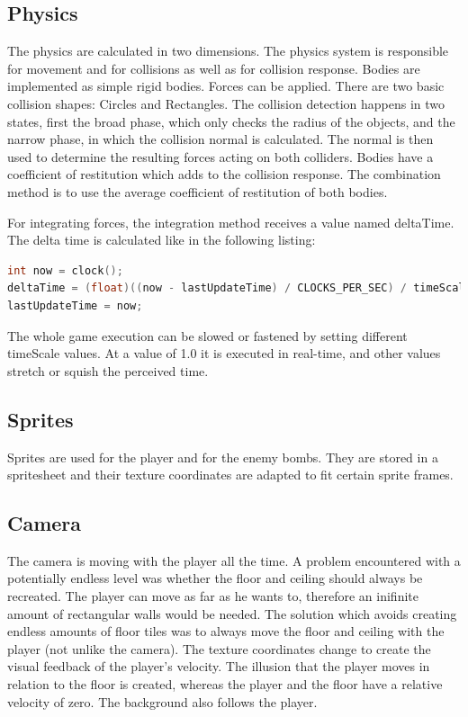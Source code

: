 \documentclass[12pt]{article}
\begin{document}
\subsection{Physics}

The physics are calculated in two dimensions. The physics system is responsible for movement and for collisions as well as for collision response. Bodies are implemented as simple rigid bodies. Forces can be applied. There are two basic collision shapes: Circles and Rectangles. The collision detection happens in two states, first the broad phase, which only checks the radius of the objects, and the narrow phase, in which the collision normal is calculated. The normal is then used to determine the resulting forces acting on both colliders. Bodies have a coefficient of restitution which adds to the collision response. The combination method is to use the average coefficient of restitution of both bodies.

For integrating forces, the integration method receives a value named deltaTime. The delta time is calculated like in the following listing:

\begin{lstlisting}[caption=deltaTime, language=C++]
int now = clock();
deltaTime = (float)((now - lastUpdateTime) / CLOCKS_PER_SEC) / timeScale;
lastUpdateTime = now;
\end{lstlisting}

The whole game execution can be slowed or fastened by setting different timeScale values. At a value of 1.0 it is executed in real-time, and other values stretch or squish the perceived time.

\subsection{Sprites}

Sprites are used for the player and for the enemy bombs. They are stored in a spritesheet and their texture coordinates are adapted to fit certain sprite frames.

\subsection{Camera}

The camera is moving with the player all the time. A problem encountered with a potentially endless level was whether the floor and ceiling should always be recreated. The player can move as far as he wants to, therefore an inifinite amount of rectangular walls would be needed. The solution which avoids creating endless amounts of floor tiles was to always move the floor and ceiling with the player (not unlike the camera). The texture coordinates change to create the visual feedback of the player's velocity. The illusion that the player moves in relation to the floor is created, whereas the player and the floor have a relative velocity of zero. The background also follows the player.
\end{document}

